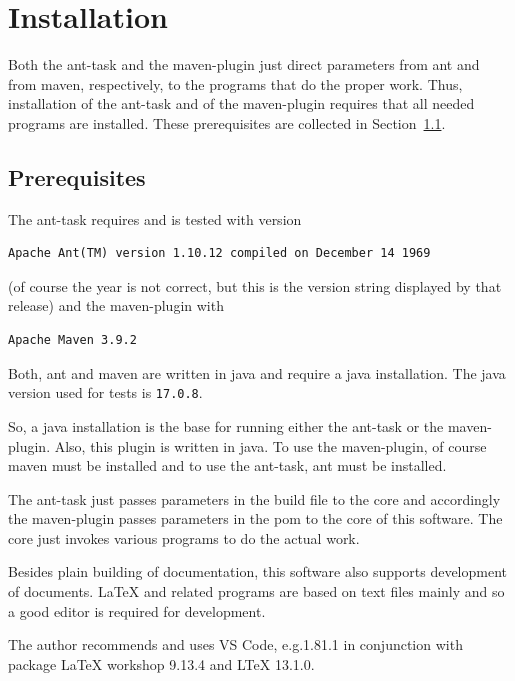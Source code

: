 
\chapter{Installation}\label{chap:install}

Both the ant-task and the maven-plugin just direct parameters 
from ant and from maven, respectively, 
to the programs that do the proper work. 
Thus, installation of the ant-task and of the maven-plugin 
requires that all needed programs are installed. 
These prerequisites are collected in Section~\ref{sec:prerequisites}. 

\section{Prerequisites}\label{sec:prerequisites}

The ant-task requires  and is tested with version 
%
\begin{verbatim}
Apache Ant(TM) version 1.10.12 compiled on December 14 1969
\end{verbatim}
%
(of course the year is not correct, but this is the version string
displayed by that release) and the maven-plugin with  
%
\begin{verbatim}
Apache Maven 3.9.2 
\end{verbatim}
%
Both, ant and maven are written in java and require a java installation. 
The java version used for tests is \texttt{17.0.8}. 


So, a java installation is the base for running either the ant-task 
or the maven-plugin. 
Also, this plugin is written in java. 
To use the maven-plugin, of course maven must be installed 
and to use the ant-task, ant must be installed. 

The ant-task just passes parameters in the build file to the core 
and accordingly the maven-plugin passes parameters in the pom 
to the core of this software. 
The core just invokes various programs to do the actual work. 

Besides plain building of documentation, 
this software also supports development of documents. 
\LaTeX{} and related programs are based on text files mainly 
and so a good editor is required for development. 

The author recommends and uses VS Code, e.g.\@ 1.81.1 
in conjunction with package \LaTeX{} workshop 9.13.4 and LTeX 13.1.0. 

